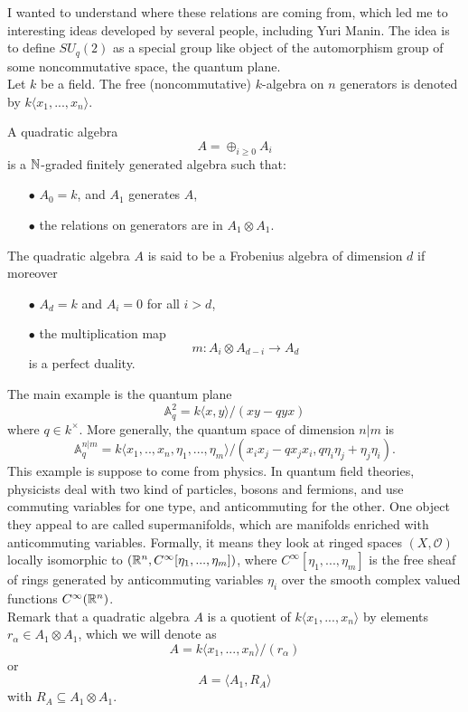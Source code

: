 I wanted to understand where these relations are coming from, which led me to interesting ideas developed by several people, including Yuri Manin. The idea is to define $SU_q(2)$ as a special group like object of the automorphism group of some noncommutative space, the quantum plane.\\

Let $k$ be a field. The free (noncommutative) $k$-algebra on $n$ generators is denoted by $k\langle x_1,... ,x_n\rangle$.

\begin{definition}
A quadratic algebra 
\[A= \oplus_{i\geq 0} A_i\] 
is a $\mathbb N$-graded finitely generated algebra such that:
\begin{itemize}
\item[$\bullet$] $A_0 = k$, and $A_1$ generates $A$,
\item[$\bullet$] the relations on generators are in $A_1 \otimes A_1$. 
\end{itemize} 
The quadratic algebra $A$ is said to be a Frobenius algebra of dimension $d$ if moreover 
\begin{itemize}
\item[$\bullet$] $A_d= k$ and $A_i =0$ for all $i>d$,
\item[$\bullet$] the multiplication map
\[m : A_i \otimes A_{d-i} \rightarrow A_d\]
is a perfect duality.
\end{itemize}
\end{definition}

The main example is the quantum plane
\[\mathbb A_q^{2} = k\langle x,y \rangle / (xy -qyx)\]
where $q\in k^\times$. More generally, the quantum space of dimension $n|m$ is
\[ \mathbb A_q^{n|m} = k\langle x_1,.. ,x_n , \eta_1,...,\eta_m \rangle / (x_i x_j - q x_j x_i , q \eta_i \eta_j +  \eta_j \eta_i).\]
This example is suppose to come from physics. In quantum field theories, physicists deal with two kind of particles, bosons and fermions, and use commuting variables for one type, and anticommuting for the other. One object they appeal to are called supermanifolds, which are manifolds enriched with anticommuting variables. Formally, it means they look at ringed spaces $(X,\mathcal O)$ locally isomorphic to $(\mathbb R^n, C^\infty [\eta_1,...,\eta_m])$, where $C^\infty [\eta_1,...,\eta_m]$ is the free sheaf of rings generated by anticommuting variables $\eta_i$ over the smooth complex valued functions $C^\infty(\mathbb R^n)$.\\

Remark that a quadratic algebra $A$ is a quotient of $k\langle x_1,... ,x_n\rangle$ by elements $r_\alpha \in A_1 \otimes A_1$, which we will denote as 
\[A= k\langle x_1,... ,x_n\rangle / (r_\alpha)\]
or \[A= \langle A_1, R_A\rangle\]
with $R_A \subseteq A_1 \otimes A_1$.\\

